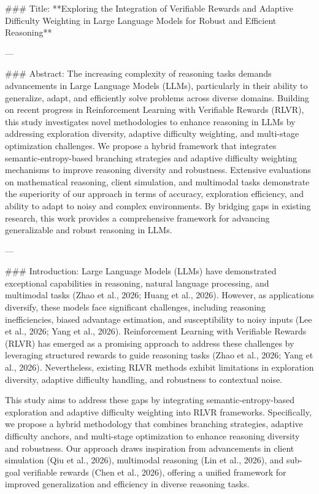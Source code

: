 ### Title:
**Exploring the Integration of Verifiable Rewards and Adaptive Difficulty Weighting in Large Language Models for Robust and Efficient Reasoning**

---

### Abstract:
The increasing complexity of reasoning tasks demands advancements in Large Language Models (LLMs), particularly in their ability to generalize, adapt, and efficiently solve problems across diverse domains. Building on recent progress in Reinforcement Learning with Verifiable Rewards (RLVR), this study investigates novel methodologies to enhance reasoning in LLMs by addressing exploration diversity, adaptive difficulty weighting, and multi-stage optimization challenges. We propose a hybrid framework that integrates semantic-entropy-based branching strategies and adaptive difficulty weighting mechanisms to improve reasoning diversity and robustness. Extensive evaluations on mathematical reasoning, client simulation, and multimodal tasks demonstrate the superiority of our approach in terms of accuracy, exploration efficiency, and ability to adapt to noisy and complex environments. By bridging gaps in existing research, this work provides a comprehensive framework for advancing generalizable and robust reasoning in LLMs.

---

### Introduction:
Large Language Models (LLMs) have demonstrated exceptional capabilities in reasoning, natural language processing, and multimodal tasks (Zhao et al., 2026; Huang et al., 2026). However, as applications diversify, these models face significant challenges, including reasoning inefficiencies, biased advantage estimation, and susceptibility to noisy inputs (Lee et al., 2026; Yang et al., 2026). Reinforcement Learning with Verifiable Rewards (RLVR) has emerged as a promising approach to address these challenges by leveraging structured rewards to guide reasoning tasks (Zhao et al., 2026; Yang et al., 2026). Nevertheless, existing RLVR methods exhibit limitations in exploration diversity, adaptive difficulty handling, and robustness to contextual noise.

This study aims to address these gaps by integrating semantic-entropy-based exploration and adaptive difficulty weighting into RLVR frameworks. Specifically, we propose a hybrid methodology that combines branching strategies, adaptive difficulty anchors, and multi-stage optimization to enhance reasoning diversity and robustness. Our approach draws inspiration from advancements in client simulation (Qiu et al., 2026), multimodal reasoning (Lin et al., 2026), and sub-goal verifiable rewards (Chen et al., 2026), offering a unified framework for improved generalization and efficiency in diverse reasoning tasks.

